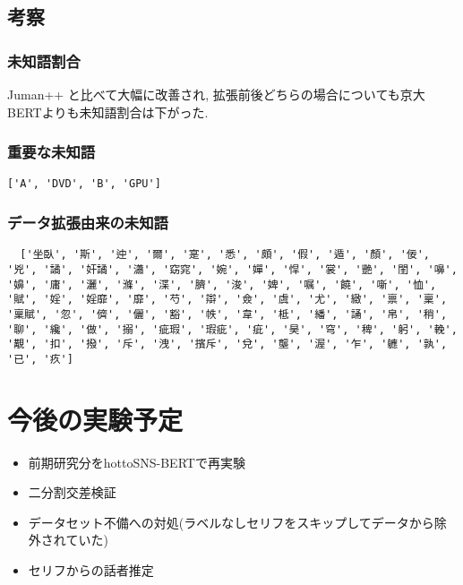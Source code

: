 \documentclass[twocolumn]{jarticle}     %
\begin{document}
\subsection{考察}
\subsubsection{未知語割合}
Juman++ と比べて大幅に改善され, 拡張前後どちらの場合についても京大BERTよりも未知語割合は下がった.
\subsubsection{重要な未知語}
\begin{verbatim}
['A', 'DVD', 'B', 'GPU']
\end{verbatim}
\subsubsection{データ拡張由来の未知語}
\begin{verbatim}
  ['坐臥', '斯', '迚', '爾', '寔', '悉', '頗', '假', '遁', '顏', '佞', '兇', '譎', '奸譎', '瀟', '窈窕', '婉', '嬋', '悍', '裳', '艷', '閨', '嚊', '嬶', '庸', '灑', '滌', '渫', '臍', '浚', '婢', '嘱', '饒', '噺', '恤', '賦', '婬', '婬靡', '靡', '芍', '辯', '僉', '虞', '尤', '緻', '禀', '稟', '稟賦', '忽', '儕', '儷', '豁', '帙', '韋', '柢', '繙', '誦', '帛', '稍', '聊', '纔', '做', '搦', '疵瑕', '瑕疵', '疵', '昊', '穹', '稗', '躬', '輓', '覯', '扣', '撥', '斥', '洩', '擯斥', '兌', '壟', '渥', '乍', '軈', '孰', '已', '疚']

\end{verbatim}
\section{今後の実験予定}
\begin{itemize}
  \item 前期研究分をhottoSNS-BERTで再実験
  \item 二分割交差検証
  \item データセット不備への対処(ラベルなしセリフをスキップしてデータから除外されていた)
  \item セリフからの話者推定
\end{itemize}



\end{document}
